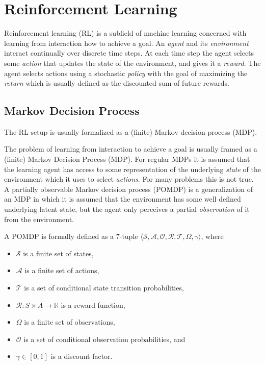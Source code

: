 \section{Reinforcement Learning}

Reinforcement learning (RL) is a subfield of machine learning concerned with learning from interaction how to achieve a goal. An \textit{agent} and its \textit{environment} interact continually over discrete time steps. At each time step the agent selects some \textit{action} that updates the state of the environment, and gives it a \textit{reward}. The agent selects actions using a stochastic \textit{policy} with the goal of maximizing the \textit{return} which is usually defined as the discounted sum of future rewards.

\subsection{Markov Decision Process}

The RL setup is usually formalized as a (finite) Markov decision process (MDP).

The problem of learning from interaction to achieve a goal is usually framed as a (finite) Markov Decision Process (MDP). For regular MDPs it is assumed that the learning agent has access to some representation of the underlying \textit{state} of the environment which it uses to select \textit{actions}. For many problems this is not true. A partially observable Markov decision process (POMDP) is a generalization of an MDP in which it is assumed that the environment has some well defined underlying latent state, but the agent only perceives a partial \textit{observation} of it from the environment. 

A POMDP is formally defined as a 7-tuple \(\langle \mathcal{S}, \mathcal{A}, \mathcal{O}, \mathcal{R}, \mathcal{T}, \Omega, \gamma \rangle\), where

\begin{itemize}
    \item \(\mathcal{S}\) is a finite set of states,
    \item \(\mathcal{A}\) is a finite set of actions,
    \item \(\mathcal{T}\) is a set of conditional state transition probabilities,
    \item \(\mathcal{R} : S \times A \rightarrow \mathbb{R}\) is a reward function,
    \item \(\Omega\) is a finite set of observations,
    \item \(\mathcal{O}\) is a set of conditional observation probabilities, and
    \item \(\gamma \in [0, 1]\) is a discount factor.
\end{itemize}

